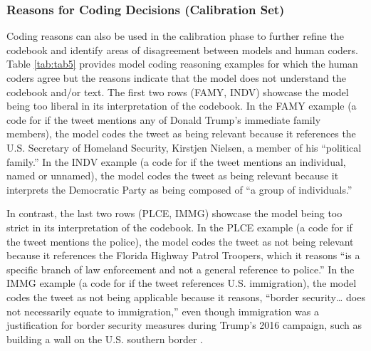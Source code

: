 \documentclass{article}
\begin{document}
\subsubsection{Reasons for Coding Decisions (Calibration Set)}
\label{code-reasons-cal}
Coding reasons can also be used in the calibration phase to further refine the codebook and identify areas of disagreement between models and human coders.  Table \ref{tab:tab5} provides model coding reasoning examples for which the human coders agree but the reasons indicate that the model does not understand the codebook and/or text.  The first two rows (FAMY, INDV) showcase the model being too liberal in its interpretation of the codebook.  In the FAMY example (a code for if the tweet mentions any of Donald Trump’s immediate family members), the model codes the tweet as being relevant because it references the U.S. Secretary of Homeland Security, Kirstjen Nielsen, a member of his “political family.”  In the INDV example (a code for if the tweet mentions an individual, named or unnamed), the model codes the tweet as being relevant because it interprets the Democratic Party as being composed of “a group of individuals.”  

In contrast, the last two rows (PLCE, IMMG) showcase the model being too strict in its interpretation of the codebook.  In the PLCE example (a code for if the tweet mentions the police), the model codes the tweet as not being relevant because it references the Florida Highway Patrol Troopers, which it reasons “is a specific branch of law enforcement and not a general reference to police.”  In the IMMG example (a code for if the tweet references U.S. immigration), the model codes the tweet as not being applicable because it reasons, “border security… does not necessarily equate to immigration,” even though immigration was a justification for border security measures during Trump’s 2016 campaign, such as building a wall on the U.S. southern border \cite{gravelle_politics_2018}.
\end{document}

